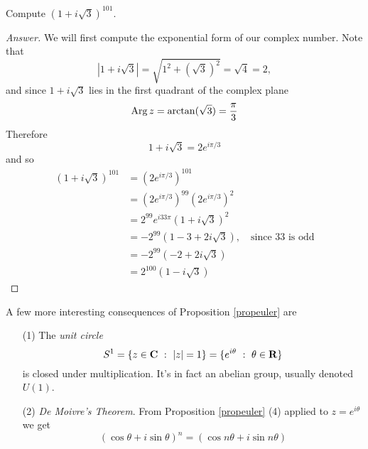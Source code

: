 \begin{discussion}
\medskip

\begin{example}
Compute $(1+i\sqrt{3})^{101}$.
\end{example}
\begin{proof}[Answer]
We will first compute the exponential form of our complex number. Note that \[|1 + i\sqrt{3}| = \sqrt{1^2 + (\sqrt{3})^2} = \sqrt{4} = 2,\] and since $1 + i\sqrt{3}$ lies in the first quadrant of the complex plane
\[\operatorname{Arg} z = \arctan(\sqrt{3}) = \frac{\pi}{3}\]
Therefore
\[1+i\sqrt{3} = 2e^{i\pi/3}\]
and so
\begin{align*}
(1+i\sqrt{3})^{101} &= (2e^{i\pi/3})^{101}\\[0.5em]
 &= (2e^{i\pi/3})^{99}(2e^{i\pi/3})^{2}\\[0.5em]
 &= 2^{99}e^{i33\pi}(1+i\sqrt{3})^{2}\\[0.5em]
 &= -2^{99}(1-3 +2i\sqrt{3}),\quad \text{since $33$ is odd}\\[0.5em]
 &= -2^{99}(-2 +2i\sqrt{3})\\[0.5em]
 &= 2^{100}(1- i\sqrt{3})
\end{align*}
\end{proof}

\medskip

A few more interesting consequences of Proposition \ref{propeuler} are
\begin{itemize}
\item[(1)] The \emph{unit circle} \[S^1 = \left\{z\in \mathbf C\ :\ \left\lvert z\right\rvert = 1\right\} = \{e^{i\theta}\ :\ \theta \in \mathbf R\}\] is closed under multiplication. It's in fact an abelian group, usually denoted $U(1)$.
\item[(2)] \emph{De Moivre's Theorem}. From Proposition \ref{propeuler} (4) applied to $z = e^{i\theta}$ we get
\[(\cos\theta + i\sin\theta)^n = (\cos n\theta + i\sin n\theta)\]
\end{itemize}
\vspace*{-\baselineskip}
\end{discussion}

\medskip

